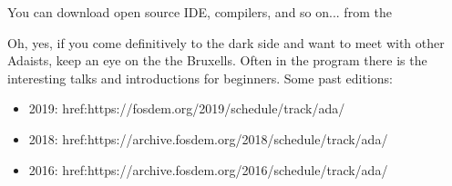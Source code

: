 \documentclass{article}
\begin{document}
   

   You can download open source IDE, compilers, and so on... from the

   

   Oh, yes, if you come definitively to the dark side and want to meet
   with other Adaists, keep an eye on the
   the
   Bruxells.  Often in the program there is the
   interesting talks and introductions for beginners.  Some past editions:

\begin{itemize}
  \item    2019: href:https://fosdem.org/2019/schedule/track/ada/
  \item    2018: href:https://archive.fosdem.org/2018/schedule/track/ada/ 
  \item    2016: href:https://archive.fosdem.org/2016/schedule/track/ada/ 
\end{itemize}
\end{document}
